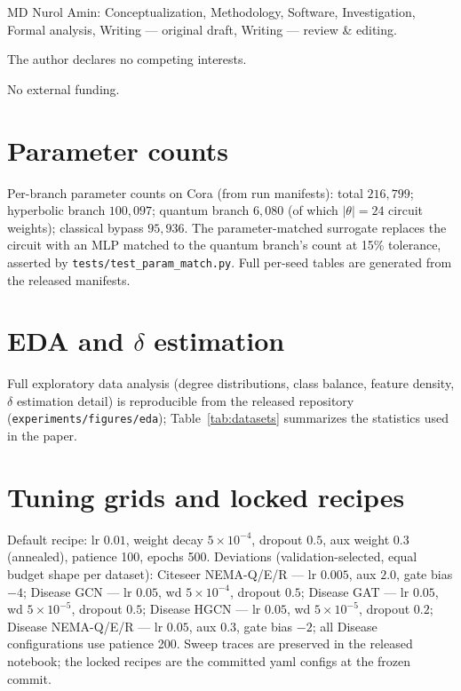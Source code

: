\documentclass[pdflatex,sn-mathphys-num]{sn-jnl}
\begin{document}
MD Nurol Amin: Conceptualization, Methodology, Software, Investigation, Formal analysis, Writing --- original draft, Writing --- review \& editing.

The author declares no competing interests.

No external funding.

\begin{appendices}

\section{Parameter counts}\label{app:params}
Per-branch parameter counts on Cora (from run manifests): total $216{,}799$; hyperbolic branch $100{,}097$; quantum branch $6{,}080$ (of which $|\theta|=24$ circuit weights); classical bypass $95{,}936$. The parameter-matched surrogate replaces the circuit with an MLP matched to the quantum branch's count at 15\% tolerance, asserted by \texttt{tests/test\_param\_match.py}. Full per-seed tables are generated from the released manifests.

\section{EDA and \texorpdfstring{$\delta$}{delta} estimation}\label{app:eda}
Full exploratory data analysis (degree distributions, class balance, feature density, $\delta$ estimation detail) is reproducible from the released repository (\texttt{experiments/figures/eda}); Table~\ref{tab:datasets} summarizes the statistics used in the paper.

\section{Tuning grids and locked recipes}\label{app:tuning}
Default recipe: lr $0.01$, weight decay $5\times10^{-4}$, dropout $0.5$, aux weight $0.3$ (annealed), patience 100, epochs 500. Deviations (validation-selected, equal budget shape per dataset): Citeseer NEMA-Q/E/R --- lr $0.005$, aux $2.0$, gate bias $-4$; Disease GCN --- lr $0.05$, wd $5\times10^{-4}$, dropout $0.5$; Disease GAT --- lr $0.05$, wd $5\times10^{-5}$, dropout $0.5$; Disease HGCN --- lr $0.05$, wd $5\times10^{-5}$, dropout $0.2$; Disease NEMA-Q/E/R --- lr $0.05$, aux $0.3$, gate bias $-2$; all Disease configurations use patience 200. Sweep traces are preserved in the released notebook; the locked recipes are the committed yaml configs at the frozen commit.


\end{appendices}
\end{document}
